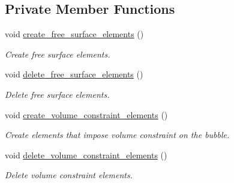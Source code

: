 \subsection*{Private Member Functions}
\begin{DoxyCompactItemize}
\item 
void \hyperlink{classBubbleInChannelProblem_a9a5a34516352db3153baa52ccb204b62}{create\+\_\+free\+\_\+surface\+\_\+elements} ()
\begin{DoxyCompactList}\small\item\em Create free surface elements. \end{DoxyCompactList}\item 
void \hyperlink{classBubbleInChannelProblem_af660f1a89b325e6da5d040f0abf837b0}{delete\+\_\+free\+\_\+surface\+\_\+elements} ()
\begin{DoxyCompactList}\small\item\em Delete free surface elements. \end{DoxyCompactList}\item 
void \hyperlink{classBubbleInChannelProblem_ae1ab79ef810211e337127878876c0fa6}{create\+\_\+volume\+\_\+constraint\+\_\+elements} ()
\begin{DoxyCompactList}\small\item\em Create elements that impose volume constraint on the bubble. \end{DoxyCompactList}\item 
void \hyperlink{classBubbleInChannelProblem_aecf64bacdf8735910d7dc7d747e1737a}{delete\+\_\+volume\+\_\+constraint\+\_\+elements} ()
\begin{DoxyCompactList}\small\item\em Delete volume constraint elements. \end{DoxyCompactList}\end{DoxyCompactItemize}
